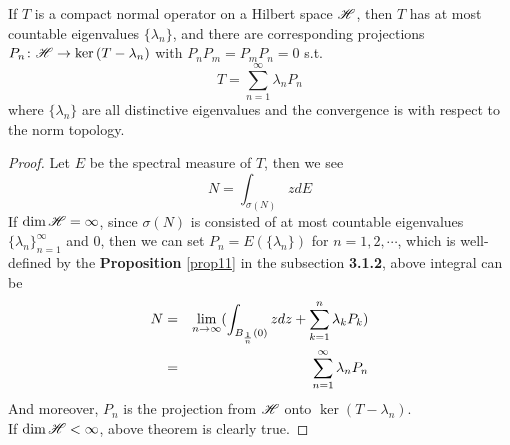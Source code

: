 \begin{thm}
	If $T$ is a compact normal operator on a Hilbert space $\mathscr{H}$, then $T$ has at most countable eigenvalues $\{\lambda_n\}$, and there are corresponding projections $P_n \colon \mathscr{H} \rightarrow \ker{(T-\lambda_n)}$ with $P_nP_m=P_mP_n=0$ s.t.
	\begin{equation*}
		T = \sum_{n=1}^{\infty} \lambda_n P_n
	\end{equation*}
	where $\{\lambda_n\}$ are all distinctive eigenvalues and the convergence is with respect to the norm topology.
\end{thm}
\begin{proof}
	Let $E$ be the spectral measure of $T$, then we see
	\begin{equation*}
		N = \int_{\sigma(N)} z dE
	\end{equation*}
	If $\dim{\mathscr{H}} = \infty$, since $\sigma(N)$ is consisted of at most countable eigenvalues $\{\lambda_n\}_{n=1}^{\infty}$ and $0$, then we can set $P_n = E(\{\lambda_n\})$ for $n = 1,2,\cdots$, which is well-defined by the \textbf{Proposition} \ref{prop11} in the subsection \textbf{3.1.2}, above integral can be
	\begin{eqnarray*}
		N &=& \lim_{n \rightarrow \infty} (\int_{B_{\frac{1}{n}}(0)} z dz + \sum_{k=1}^{n} \lambda_k P_k) \\
		&=& \sum_{n=1}^{\infty} \lambda_n P_n
	\end{eqnarray*} 
	And moreover, $P_n$ is the projection from $\mathscr{H}$ onto $\ker{(T-\lambda_n)}$. \\
	If $\dim{\mathscr{H}} < \infty$, above theorem is clearly true.
\end{proof}

